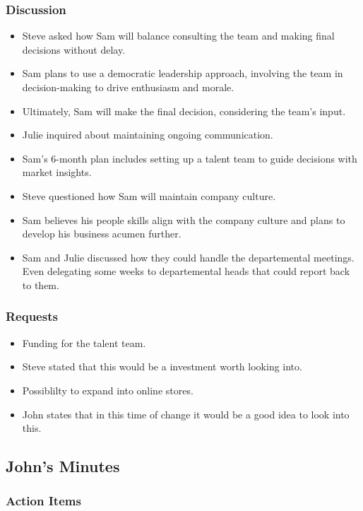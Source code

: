 \documentclass[a4paper,12pt]{article}
\begin{document}
\subsubsection{Discussion}
\begin{itemize}
    \item Steve asked how Sam will balance consulting the team and making final decisions without delay.
    \item Sam plans to use a democratic leadership approach, involving the team in decision-making to drive enthusiasm and morale.
    \item Ultimately, Sam will make the final decision, considering the team's input.
    \item Julie inquired about maintaining ongoing communication.
    \item Sam's 6-month plan includes setting up a talent team to guide decisions with market insights.
    \item Steve questioned how Sam will maintain company culture.
    \item Sam believes his people skills align with the company culture and plans to develop his business acumen further.
    \item Sam and Julie discussed how they could handle the departemental meetings. Even delegating some weeks to departemental heads that could report back to them.
\end{itemize}

\subsubsection{Requests}
\begin{itemize}
    \item Funding for the talent team.
    \item Steve stated that this would be a investment worth looking into.
    \item Possiblilty to expand into online stores.
    \item John states that in this time of change it would be a good idea to look into this.
\end{itemize}

\subsection{John's Minutes}
\author{Graham Pellegrini (Sam)}

\subsubsection{Action Items}
\end{document}
